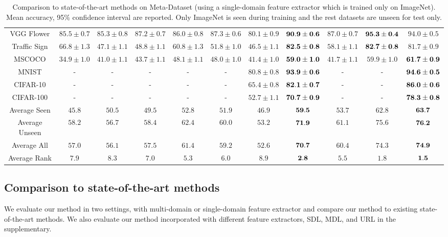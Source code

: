 \begin{table*}[ht]
{\begin{tabular}{cccccccc|ccc}
			VGG Flower & $85.5 \pm 0.7$ & $85.3 \pm 0.8$ & $87.2 \pm 0.7$ & $86.0 \pm 0.8$ & $87.3 \pm 0.6$ & $80.1 \pm 0.9$ & ${\bf 90.9 \pm 0.6}$ & $87.0 \pm 0.7$ & ${\bf 95.3 \pm 0.4}$ & $94.0 \pm 0.5$ \\
			Traffic Sign & $66.8 \pm 1.3$ & $47.1 \pm 1.1$ & $48.8 \pm 1.1$ & $60.8 \pm 1.3$ & $51.8 \pm 1.0$ & $46.5 \pm 1.1$ & ${\bf 82.5 \pm 0.8}$ & $58.1 \pm 1.1$ & ${\bf 82.7 \pm 0.8}$ & $81.7 \pm 0.9$ \\
			MSCOCO & $34.9 \pm 1.0$ & $41.0 \pm 1.1$ & $43.7 \pm 1.1$ & $48.1 \pm 1.1$ & $48.0 \pm 1.0$ & $41.4 \pm 1.0$ & ${\bf 59.0 \pm 1.0}$ & $41.7 \pm 1.1$ & $59.9 \pm 1.0$ & ${\bf 61.7 \pm 0.9}$ \\
			MNIST & - & - & - & - & - & $80.8 \pm 0.8$ & ${\bf 93.9 \pm 0.6}$ & - & - & ${\bf 94.6 \pm 0.5}$ \\
			CIFAR-10 & - & - & - & - & - & $65.4 \pm 0.8$ & ${\bf 82.1 \pm 0.7}$ & - & - & ${\bf 86.0 \pm 0.6}$ \\
			CIFAR-100 & - & - & - & - & - & $52.7 \pm 1.1$ & ${\bf 70.7 \pm 0.9}$ & - & - & ${\bf 78.3 \pm 0.8}$ \\
			\midrule
			Average Seen & $45.8$ & $50.5$ & $49.5$ & $52.8$ & $51.9$ & $46.9$ & ${\bf 59.5}$ & $53.7$ & $62.8$ & ${\bf 63.7}$ \\
			Average Unseen & $58.2$ & $56.7$ & $58.4$ & $62.4$ & $60.0$ & $53.2$ & ${\bf 71.9}$ & $61.1$ & $75.6$ & ${\bf 76.2}$ \\
			Average All & $57.0$ & $56.1$ & $57.5$ & $61.4$ & $59.2$ & $52.6$ & ${\bf 70.7}$ & $60.4$ & $74.3$ & ${\bf 74.9}$ \\
			\midrule
			Average Rank & $7.9$ & $8.3$ & $7.0$ & $5.3$ & $6.0$ & $8.9$ & ${\bf 2.8}$ & $5.5$ & $1.8$ & ${\bf 1.5}$ \\
			\bottomrule
		\end{tabular}%
			}
		\vspace{-0.35cm}
		\caption{Comparison to state-of-the-art methods on Meta-Dataset (using a single-domain feature extractor which is trained only on ImageNet). Mean accuracy, 95\% confidence interval are reported. Only ImageNet is seen during training and the rest datasets are unseen for test only.}
		\label{tab:currmethodimagenet}
\end{table*}%

\subsection{Comparison to state-of-the-art methods}
We evaluate our method in two settings, with multi-domain or single-domain feature extractor and compare our method to existing state-of-the-art methods. We also evaluate our method incorporated with different feature extractors, \ie SDL, MDL, and URL in the supplementary.

